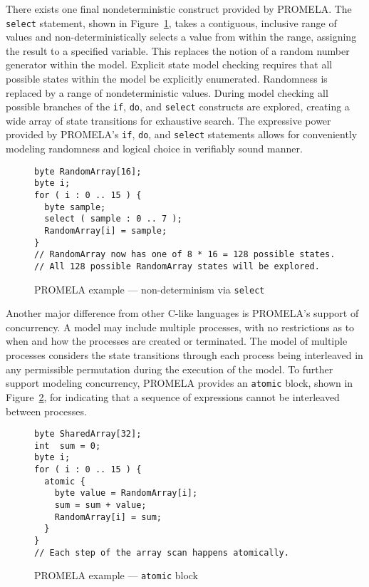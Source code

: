 There exists one final nondeterministic construct provided by PROMELA.\@
The \texttt{select} statement, shown in Figure\ \ref{fig:selection}, takes a contiguous, inclusive range of values and non-deterministically selects a value from within the range, assigning the result to a specified variable.
This replaces the notion of a random number generator within the model.
Explicit state model checking requires that all possible states within the model be explicitly enumerated.
Randomness is replaced by a range of nondeterministic values.
During model checking all possible branches of the \texttt{if}, \texttt{do}, and \texttt{select} constructs are explored, creating a wide array of state transitions for exhaustive search.
The expressive power provided by PROMELA's \texttt{if}, \texttt{do}, and \texttt{select} statements allows for conveniently modeling randomness and logical choice in verifiably sound manner.

\begin{figure}
\centering
\caption{\label{fig:selection}PROMELA example --- non-determinism via \texttt{select}}
\begin{verbatim}
byte RandomArray[16];
byte i;
for ( i : 0 .. 15 ) {
  byte sample;
  select ( sample : 0 .. 7 );
  RandomArray[i] = sample;
}
// RandomArray now has one of 8 * 16 = 128 possible states.
// All 128 possible RandomArray states will be explored.
\end{verbatim}
\end{figure}

Another major difference from other C-like languages is PROMELA's support of concurrency.
A model may include multiple processes, with no restrictions as to when and how the processes are created or terminated.
The model of multiple processes considers the state transitions through each process being interleaved in any permissible permutation during the execution of the model.
To further support modeling concurrency, PROMELA provides an \texttt{atomic} block, shown in Figure\ \ref{fig:atomic}, for indicating that a sequence of expressions cannot be interleaved between processes.

\begin{figure}
\centering
\caption{\label{fig:atomic}PROMELA example --- \texttt{atomic} block}
\begin{verbatim}
byte SharedArray[32];
int  sum = 0; 
byte i;
for ( i : 0 .. 15 ) {
  atomic {
    byte value = RandomArray[i];
    sum = sum + value;
    RandomArray[i] = sum;
  }
}
// Each step of the array scan happens atomically.
\end{verbatim}
\end{figure}


